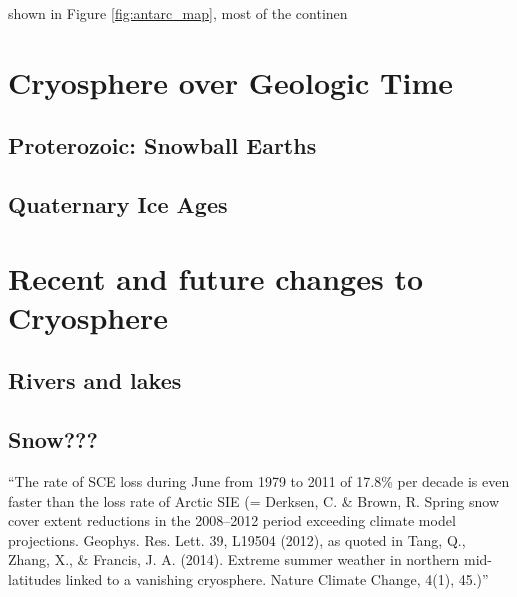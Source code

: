 \documentclass[amstex,12pt]{book}
\begin{document}
 shown in Figure \ref{fig:antarc_map}, most of the continen %

\section{Cryosphere over Geologic Time}  \label{Snow-ball Earth}
\subsection{Proterozoic: Snowball Earths}
\subsection{Quaternary Ice Ages}

\section{Recent and future changes to Cryosphere}  \label{Our Rapidly Changing Cryosphere}
\subsection{Rivers and lakes}
\subsection{Snow???}
``The rate of SCE loss during June from 1979 to 2011 of 17.8\% per decade is even faster than the loss rate of Arctic SIE (= Derksen, C. \& Brown, R. Spring snow cover extent reductions in the 2008–2012 period exceeding climate model projections. Geophys. Res. Lett. 39, L19504 (2012), as quoted in Tang, Q., Zhang, X., \& Francis, J. A. (2014). Extreme summer weather in northern mid-latitudes linked to a vanishing cryosphere. Nature Climate Change, 4(1), 45.)''
\end{document}
